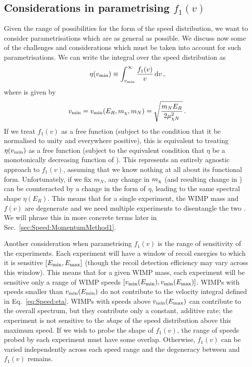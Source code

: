 \subsection{Considerations in parametrising $f_1(v)$}


Given the range of possibilities for the form of the speed distribution, we want to consider parametrisations which are as general as possible. We discuss now some of the challenges and considerations which must be taken into account for such parametrisations. We can write the integral over the speed distribution as
\begin{equation}
\label{eq:Speed:eta}
\eta(\vmin) \equiv \int_{\vmin}^\infty \frac{f_1(v)}{v}\,\mathrm{d}v\,,
\end{equation}
where \vmin is given by
\begin{equation}
v_\textrm{min} = v_\textrm{min}(E_R, \mchi, m_N) = \sqrt{\frac{m_N E_R}{2 \mu_{\chi N}^2}}\,.
\end{equation}
If we treat $f_1(v)$ as a free function (subject to the condition that it be normalised to unity and everywhere positive), this is equivalent to treating $\eta(\vmin)$ as a free function (subject to the equivalent condition that $\eta$ be a monotonically decreasing function of \vmin). This represents an entirely agnostic approach to $f_1(v)$, assuming that we know nothing at all about its functional form. Unfortunately, if we fix $m_N$, any change in $\mchi$ (and resulting change in \vmin) can be counteracted by a change in the form of $\eta$, leading to the same spectral shape $\eta(E_R)$. This means that for a single experiment, the WIMP mass and $f(v)$ are degenerate and we need multiple experiments to disentangle the two \cite{Drees:2008}. We will phrase this in more concrete terms later in Sec.~\ref{sec:Speed:MomentumMethod1}.

Another consideration when parametrising $f_1(v)$ is the range of sensitivity of the experiments. Each experiment will have a window of recoil energies to which it is sensitive $\left[\Emin, \Emax\right]$ (though the recoil detection efficiency may vary across this window). This means that for a given WIMP mass, each experiment will be sensitive only a range of WIMP speeds $\left[\vmin(\Emin), \vmin(\Emax)\right]$. WIMPs with speeds smaller than $\vmin(\Emin)$ do not contribute to the velocity integral defined in Eq.~\ref{eq:Speed:eta}. WIMPs with speeds above $\vmin(\Emax)$ can contribute to the overall spectrum, but they contribute only a constant, additive rate; the experiment is not sensitive to the \textit{shape} of the speed distribution above this maximum speed. If we wish to probe the shape of $f_1(v)$, the range of speeds probed by each experiment must have some overlap. Otherwise, $f_1(v)$ can be varied independently across each speed range and the degeneracy between \mchi and $f_1(v)$ remains.

